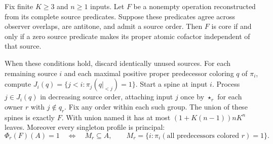 \begin{theorem}
\label{core:thm:acyclic-source-guards}
Fix finite $K\geq3$ and $n\geq1$ inputs. Let $F$ be a nonempty
operation reconstructed from its complete source predicates. Suppose
these predicates agree across observer overlaps, are antitone, and
admit a source order. Then $F$ is core if and only if a zero source
predicate makes its proper atomic cofactor independent of that source.

When these conditions hold, discard identically unused sources. For each
remaining source $i$ and each maximal positive proper predecessor coloring
$q$ of $\pi_i$, compute $J_i(q)=\{j<i:\pi_j(q|_{<j})=1\}$.
Start a spine at input $i$. Process $j\in J_i(q)$ in decreasing source
order, attaching input $j$ once by $\star_r$ for each owner $r$ with
$j\notin q_r$. Fix any order within each such group.
The union of these spines is exactly $F$.
With union named it has at most
$(1+K(n-1))nK^n$ leaves.
Moreover every singleton profile is principal:
\[
 \Phi_r(F)(A)=1\quad\Longleftrightarrow\quad M_r\subseteq A,
 \qquad M_r=\{i:\pi_i(\text{all predecessors colored }r)=1\}.
\]
\end{theorem}
